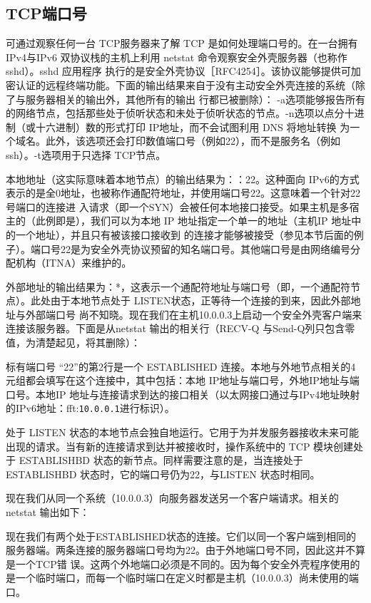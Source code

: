 \subsection{TCP端口号}
可通过观察任何一台 TCP服务器来了解 TCP 是如何处理端口号的。在一台拥有 IPv4与IPv6 双协议栈的主机上利用 netstat 命令观察安全外壳服务器（也称作 sshd）。sshd 应用程序
执行的是安全外壳协议［RFC4254］。该协议能够提供可加密认证的远程终端功能。下面的输出结果来自于没有主动安全外壳连接的系统（除了与服务器相关的输出外，其他所有的输出
行都已被删除）：
-a选项能够报告所有的网络节点，包括那些处于侦听状态和未处于侦听状态的节点。-n选项以点分十进制（或十六进制）数的形式打印 IP地址，而不会试图利用 DNS 将地址转换
为一个域名。此外，该选项还会打印数值端口号（例如22），而不是服务名（例如ssh）。-t选项用于只选择 TCP节点。

本地地址（这实际意味着本地节点）的输出结果为：：22。这种面向 IPv6的方式表示的是全0地址，也被称作通配符地址，并使用端口号22。这意味着一个针对22号端口的连接进
入请求（即一个SYN）会被任何本地接口接受。如果主机是多宿主的（此例即是），我们可以为本地 IP 地址指定一个单一的地址（主机IP 地址中的一个地址），并且只有被该接口接收到
的连接才能够被接受（参见本节后面的例子）。端口号22是为安全外壳协议预留的知名端口号。其他端口号是由网络编号分配机构（ITNA）来维护的。

外部地址的输出结果为：*，这表示一个通配符地址与端口号（即，一个通配符节点）。此处由于本地节点处于 LISTEN状态，正等待一个连接的到来，因此外部地址与外部端口号
尚不知晓。现在我们在主机10.0.0.3上启动一个安全外壳客户端来连接该服务器。下面是从netstat 输出的相关行（RECV-Q 与Send-Q列只包含零值，为清楚起见，将其删除）：

标有端口号 “22”的第2行是一个 ESTABLISHED 连接。本地与外地节点相关的4元组都会填写在这个连接中，其中包括：本地 IP地址与端口号，外地IP地址与端口号。本地IP
地址与连接请求到达的接口相关（以太网接口通过与IPv4地址映射的IPv6地址：fft:\verb|10.0.0.1|进行标识）。

处于 LISTEN 状态的本地节点会独自地运行。它用于为并发服务器接收未来可能出现的请求。当有新的连接请求到达并被接收时，操作系统中的 TCP 模块创建处于 ESTABLISHBD
状态的新节点。同样需要注意的是，当连接处于 ESTABLISHBD 状态时，它的端口号仍为22，与LISTEN 状态时相同。

现在我们从同一个系统（10.0.0.3）向服务器发送另一个客户端请求。相关的 netstat 输出如下：

现在我们有两个处于ESTABLISHED状态的连接。它们以同一个客户端到相同的服务器端。两条连接的服务器端口号均为22。由于外地端口号不同，因此这并不算是一个TCP错
误。这两个外地端口必须是不同的。因为每个安全外壳程序使用的是一个临时端口，而每一个临时端口在定义时都是主机（10.0.0.3）尚未使用的端口。

